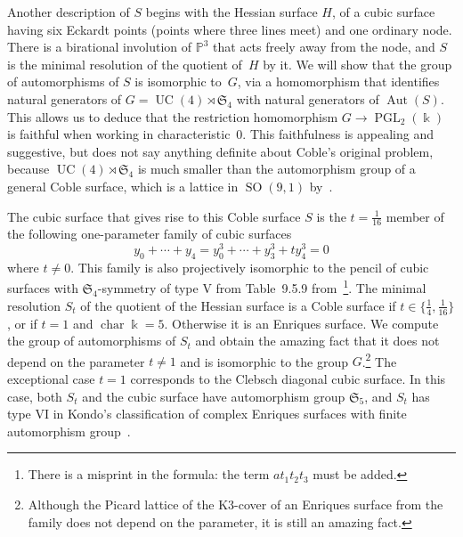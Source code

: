 \documentclass[11pt]{article}
\theoremstyle{definition}
\numberwithin{equation}{section}
\numberwithin{figure}{section}
\numberwithin{table}{section}
\newcommand{\bbP}{{\mathbb{P}}}
\DeclareMathOperator{\PGL}{PGL}
\DeclareMathOperator{\Aut}{Aut}
\DeclareMathOperator{\cha}{char}
\DeclareMathOperator{\SO}{SO}
\DeclareMathOperator{\UC}{UC}
\newcommand{\frakS}{\mathfrak{S}}
\begin{document}
Another description of $S$ begins with the Hessian surface $H$, of a cubic surface having six Eckardt points (points where three lines meet) and one ordinary node. There is a birational involution of $\bbP^3$ that acts freely away from the node, and $S$ is the minimal resolution of the quotient of~$H$ by it. We will show that the group of automorphisms of $S$ is isomorphic to~$G$, via a homomorphism that identifies natural generators of $G = \UC(4)\rtimes \frakS_4$ with natural generators of $\Aut(S)$. This allows us to deduce that the restriction homomorphism $G\to\PGL_2(\Bbbk)$ is faithful when working in characteristic~$0$. This faithfulness is appealing and suggestive, but does not say anything definite about Coble's original problem, because $\UC(4)\rtimes\frakS_4$ is much smaller than the automorphism group of a general Coble surface, which is a lattice in $\SO(9,1)$ by~\cite[Theorem~2.10.1]{CossecDolgachev}.

The cubic surface that gives rise to this Coble surface $S$ is the $t=\frac1{16}$ member of the following one-parameter family of cubic surfaces
\begin{equation*}
y_0+\cdots+y_4=y_0^3+\cdots+y_3^3+ty_4^3=0
\end{equation*}
where $t\neq0$. This family is also projectively isomorphic to the pencil of cubic surfaces with $\frakS_4$-symmetry of type V from Table~9.5.9 from~\cite{CAG}\footnote{There is a misprint in the formula: the term $at_1t_2t_3$ must be added.}\!. %
The minimal resolution $S_t$ of the quotient of the Hessian surface is a Coble surface if $t\in\{\frac{1}{4}, \frac{1}{16}\}$, or if $t=1$ and $\cha\Bbbk=5$. Otherwise it is an Enriques surface. We compute the group of automorphisms of $S_t$ and obtain the amazing fact that it does not depend on the parameter $t\ne 1$ and is isomorphic to the group $G$.\footnote{Although the Picard lattice of the K3-cover of an Enriques surface from the family does not depend on the parameter, it is still an amazing fact.} The exceptional case $t = 1$ corresponds to the Clebsch diagonal cubic surface. In this case, both $S_t$ and the cubic surface have automorphism group $\frakS_5$, and $S_t$ has type VI in Kondo's classification of complex Enriques surfaces with finite automorphism group~\cite{Kondo}.
\end{document}
